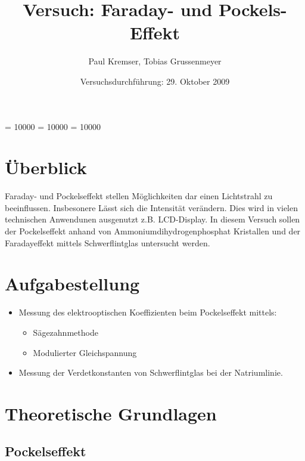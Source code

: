\documentclass[12pt]{article}
\newcommand{\changefont}[3]{
\fontfamily{#1} \fontseries{#2} \fontshape{#3} \selectfont}
\begin{document}
\clubpenalty = 10000
\widowpenalty = 10000 
\displaywidowpenalty = 10000

\onehalfspacing
\changefont{ptm}{m}{n} 

\begin{titlepage}
\author{Paul Kremser, Tobias Grussenmeyer}
\title{Versuch: Faraday- und Pockels-Effekt}
\date{Versuchsdurchführung: 29. Oktober 2009} 
\maketitle
\thispagestyle{empty}
\end{titlepage}


\tableofcontents
\thispagestyle{empty}
\newpage
{}
\section{Überblick}
Faraday- und Pockelseffekt stellen Möglichkeiten dar einen Lichtstrahl zu beeinflussen. Insbesonere Lässt sich die Intensität verändern. Dies wird in vielen technischen Anwendunen ausgenutzt z.B. LCD-Display. In diesem Versuch sollen der Pockelseffekt anhand von Ammoniumdihydrogenphosphat Kristallen und der Faradayeffekt mittels Schwerflintglas untersucht werden.

\section{Aufgabestellung}
\begin{itemize}


 \item Messung des elektrooptischen Koeffizienten beim Pockelseffekt mittels:
\begin{itemize}
 \item Sägezahnmethode
 \item Modulierter Gleichspannung
\end{itemize}

 \item Messung der Verdetkonstanten von Schwerflintglas bei der Natriumlinie.
 
\end{itemize}
\section{Theoretische Grundlagen}

\subsection{Pockelseffekt}
\end{document}
